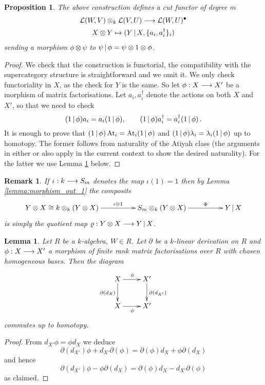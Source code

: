 \documentclass[english,letter paper,12pt,leqno]{article}
\newtheorem{proposition}[theorem]{Proposition}
\newtheorem{lemma}[theorem]{Lemma}
\theoremstyle{example}
\newtheorem{remark}[theorem]{Remark}
\numberwithin{equation}{section}
\DeclareMathOperator{\At}{At}
\begin{document}
\begin{proposition} The above construction defines a cut functor of degree $m$
\begin{gather*}
\mathcal{L}(W, V) \otimes_k \mathcal{L}(V,U) \longrightarrow \mathcal{L}(W, U)^\bullet\\
X \otimes Y \mapsto (Y \,|\, X, \{ a_i, a_i^\dagger \}_i )
\end{gather*}
sending a morphism $\phi \otimes \psi$ to $\psi \,|\, \phi = \psi \otimes 1 \otimes \phi$.
\end{proposition}
\begin{proof}
We check that the construction is functorial, the compatibility with the supercategory structure is straightforward and we omit it. We only check functoriality in $X$, as the check for $Y$ is the same. So let $\phi: X \longrightarrow X'$ be a morphism of matrix factorisations. Let $a_i, a_i^\dagger$ denote the actions on both $X$ and $X'$, so that we need to check
\[
(1\,|\,\phi) a_i = a_i (1 \,|\, \phi), \qquad (1\,|\,\phi) a_i^\dagger = a_i^\dagger (1 \,|\, \phi)\,.
\]
It is enough to prove that $(1 \l \phi) \At_i = \At_i (1 \l \phi)$ and $(1 \,|\, \phi) \lambda_i = \lambda_i (1 \,|\, \phi)$ up to homotopy. The former follows from naturality of the Atiyah class (the arguments in either \cite[Lemma 3.3]{buchweitz_flenner} or \cite[Lemma 3.6]{dm1102.2957} also apply in the current context to show the desired naturality). For the latter we use Lemma \ref{lemma:naturalityoflambda} below.
\end{proof}

\begin{remark}\label{remark:iso_quotient_map} If $\iota: k \longrightarrow S_m$ denotes the map $\iota(1) = 1$ then by Lemma \ref{lemma:morphism_out_1} the composite
\[
\xymatrix@C+2pc{
Y \otimes X \cong k \otimes_k ( Y \otimes X ) \ar[r]^-{\iota \otimes 1} & S_m \otimes_k ( Y \otimes X ) \ar[r]^-{\Phi} & Y \l X
}
\]
is simply the quotient map $\varrho: Y \otimes X \longrightarrow Y \,|\, X$.
\end{remark}

\begin{lemma}\label{lemma:naturalityoflambda} Let $R$ be a $k$-algebra, $W \in R$. Let $\partial$ be a $k$-linear derivation on $R$ and $\phi: X \longrightarrow X'$ a morphism of finite rank matrix factorisations over $R$ with chosen homogeneous bases. Then the diagram
\[
\xymatrix{
X \ar[d]_{\partial(d_X)} \ar[r]^\phi & X' \ar[d]^{\partial(d_{X'})}\\
X \ar[r]_{\phi} & X'
}
\]
commutes up to homotopy.
\end{lemma}
\begin{proof}
From $d_{X'} \phi = \phi d_X$ we deduce
\[
\partial( d_{X'} ) \phi + d_{X'} \partial( \phi ) = \partial( \phi ) d_X + \phi \partial( d_X )
\]
and hence
\[
\partial( d_{X'} ) \phi - \phi \partial( d_X ) = \partial(\phi) d_X - d_{X'} \partial(\phi)
\]
as claimed.
\end{proof}
\end{document}
